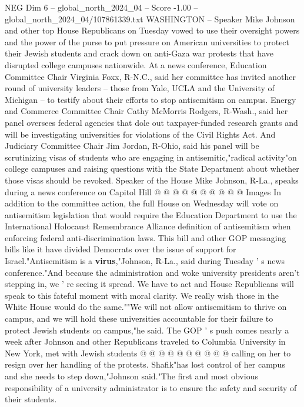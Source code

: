 \begin{textsample}{NEG Dim 6 – global\_north\_2024\_04 – Score -1.00 – global\_north\_2024\_04/107861339.txt}  \label{ex:f6_neg_337}
WASHINGTON -- Speaker Mike Johnson and other top House Republicans on Tuesday vowed to use their oversight powers and the power of the purse to put pressure on American universities to protect their Jewish students and crack down on anti-Gaza war protests that have disrupted college campuses nationwide.
At a news conference, Education Committee Chair Virginia Foxx, R-N.C., said her committee has invited another round of university leaders -- those from Yale, UCLA and the University of Michigan -- to testify about their efforts to stop antisemitism on campus.
Energy and Commerce Committee Chair Cathy McMorris Rodgers, R-Wash., said her panel oversees federal agencies that dole out taxpayer-funded research grants and will be investigating universities for violations of the Civil Rights Act.
And Judiciary Committee Chair Jim Jordan, R-Ohio, said his panel will be scrutinizing visas of students who are engaging in antisemitic,"radical activity"on college campuses and raising questions with the State Department about whether those visas should be revoked.
Speaker of the House Mike Johnson, R-La., speaks during a news conference on Capitol Hill @ @ @ @ @ @ @ @ @ @ Images In addition to the committee action, the full House on Wednesday will vote on antisemitism legislation that would require the Education Department to use the International Holocaust Remembrance Alliance definition of antisemitism when enforcing federal anti-discrimination laws.
This bill and other GOP messaging bills like it have divided Democrats over the issue of support for Israel."Antisemitism is a \textbf{virus},"Johnson, R-La., said during Tuesday ' s news conference."And because the administration and woke university presidents aren't stepping in, we ' re seeing it spread.
We have to act and House Republicans will speak to this fateful moment with moral clarity.
We really wish those in the White House would do the same.""We will not allow antisemitism to thrive on campus, and we will hold these universities accountable for their failure to protect Jewish students on campus,"he said.
The GOP ' s push comes nearly a week after Johnson and other Republicans traveled to Columbia University in New York, met with Jewish students @ @ @ @ @ @ @ @ @ @ calling on her to resign over her handling of the protests.
Shafik"has lost control of her campus and she needs to step down,"Johnson said."The first and most obvious responsibility of a university administrator is to ensure the safety and security of their students.

\end{textsample}
